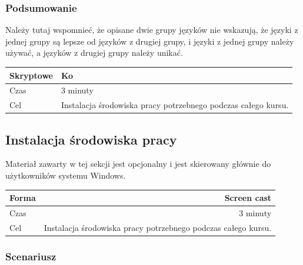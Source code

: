 \documentclass{mwart}
\begin{document}
\subsubsection{Podsumowanie}
Należy tutaj wspomnieć, że opisane dwie grupy języków nie wskazują, że języki z jednej
grupy są lepsze od języków z drugiej grupy, i języki z jednej grupy należy używać, a
języków z drugiej grupy należy unikać.

\begin{center}
  \begin{tabular}{ll}
    \toprule
    Skryptowe & Ko \\
    \midrule
    Czas & 3 minuty \\
    Cel & Instalacja środowiska pracy potrzebnego podczas całego kursu. \\
    \bottomrule
  \end{tabular}
\end{center}


\subsection{Instalacja środowiska pracy}

Materiał zawarty w tej sekcji jest opcjonalny i jest skierowany głównie do użytkowników systemu
Windows.
\begin{center}
  \begin{tabular}{lr}
    \toprule
    Forma & Screen cast \\
    \midrule
    Czas & 3 minuty \\
    Cel & Instalacja środowiska pracy potrzebnego podczas całego kursu. \\
    \bottomrule
  \end{tabular}
\end{center}

\subsubsection{Scenariusz}
\end{document}
